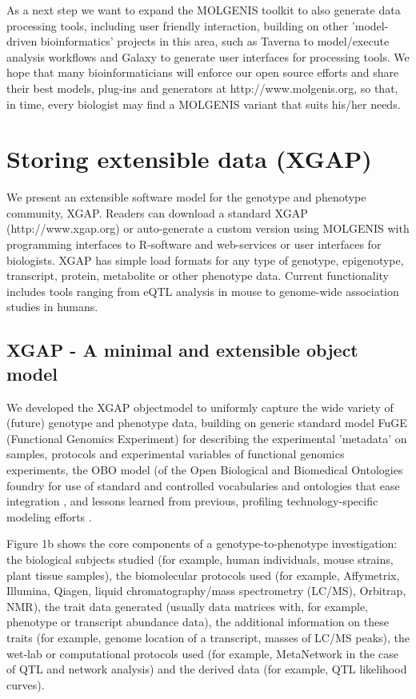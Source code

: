 As a next step we want to expand the MOLGENIS toolkit to also generate data processing tools, 
including user friendly interaction, building on other 'model-driven bioinformatics' projects 
in this area, such as Taverna \cite{Oinn:2004} to model/execute analysis workflows and Galaxy 
\cite{Goecks:2010} to generate user interfaces for processing tools. We hope that many 
bioinformaticians will enforce our open source efforts and share their best models, 
plug-ins and generators at http://www.molgenis.org, so that, in time, every biologist may 
find a MOLGENIS variant that suits his/her needs.

\section{Storing extensible data (XGAP)}
We present an extensible software model for the genotype and phenotype community, XGAP. Readers 
can download a standard XGAP (http://www.xgap.org) or auto-generate a custom version using 
MOLGENIS with programming interfaces to R-software and web-services or user interfaces for 
biologists. XGAP has simple load formats for any type of genotype, epigenotype, transcript, 
protein, metabolite or other phenotype data. Current functionality includes tools ranging 
from eQTL analysis in mouse to genome-wide association studies in humans.

\subsection{XGAP - A minimal and extensible object model}
We developed the XGAP objectmodel to uniformly capture the wide variety of (future) genotype 
and phenotype data, building on generic standard model FuGE (Functional Genomics Experiment) 
\cite{Jones:2007} for describing the experimental 'metadata' on samples, protocols and experimental variables 
of functional genomics experiments, the OBO model (of the Open Biological and Biomedical 
Ontologies foundry for use of standard and controlled vocabularies and ontologies that ease 
integration \cite{Smith:2007}, and lessons learned from previous, profiling 
technology-specific modeling efforts \cite{Brazma:2006}.

Figure 1b shows the core components of a genotype-to-phenotype investigation: the biological 
subjects studied (for example, human individuals, mouse strains, plant tissue samples), the 
biomolecular protocols used (for example, Affymetrix, Illumina, Qiagen, liquid 
chromatography/mass spectrometry (LC/MS), Orbitrap, NMR), the trait data generated (usually 
data matrices with, for example, phenotype or transcript abundance data), the additional 
information on these traits (for example, genome location of a transcript, masses of LC/MS peaks), 
the wet-lab or computational protocols used (for example, MetaNetwork \cite{Fu:2007} in the case of QTL and
network analysis) and the derived data (for example, QTL likelihood curves).

